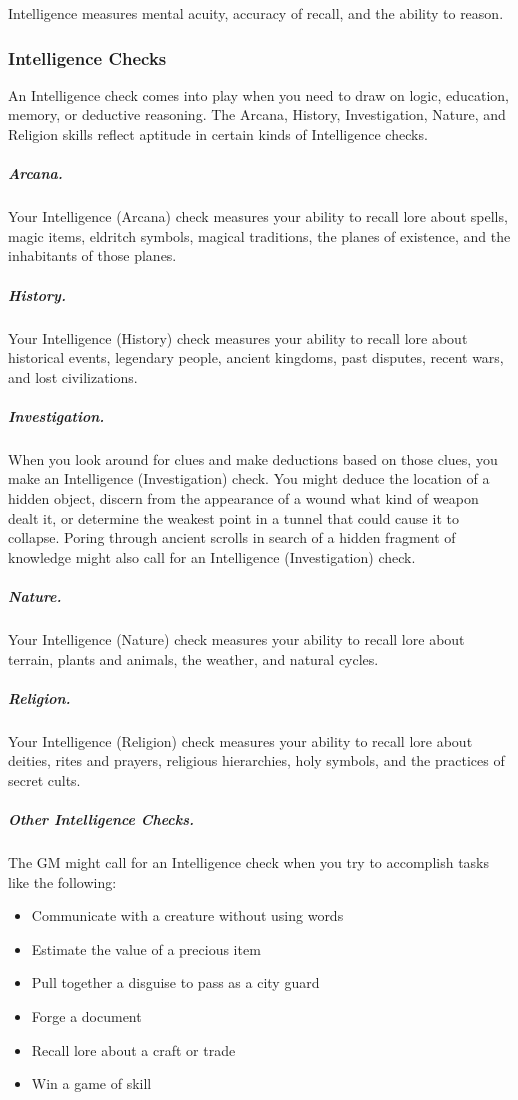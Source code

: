 Intelligence measures mental acuity, accuracy of recall, and the ability to reason.

\subsubsection{Intelligence Checks}

An Intelligence check comes into play when you need to draw on logic, education, memory, or deductive reasoning. The Arcana, History, Investigation, Nature, and Religion skills reflect aptitude in certain kinds of Intelligence checks.

\subparagraph*{Arcana.} Your Intelligence (Arcana) check measures your ability to recall lore about spells, magic items, eldritch symbols, magical traditions, the planes of existence, and the inhabitants of those planes.

\subparagraph*{History.} Your Intelligence (History) check measures your ability to recall lore about historical events, legendary people, ancient kingdoms, past disputes, recent wars, and lost civilizations.

\subparagraph*{Investigation.} When you look around for clues and make deductions based on those clues, you make an Intelligence (Investigation) check. You might deduce the location of a hidden object, discern from the appearance of a wound what kind of weapon dealt it, or determine the weakest point in a tunnel that could cause it to collapse. Poring through ancient scrolls in search of a hidden fragment of knowledge might also call for an Intelligence (Investigation) check.

\subparagraph*{Nature.} Your Intelligence (Nature) check measures your ability to recall lore about terrain, plants and animals, the weather, and natural cycles.

\subparagraph*{Religion.} Your Intelligence (Religion) check measures your ability to recall lore about deities, rites and prayers, religious hierarchies, holy symbols, and the practices of secret cults.

\subparagraph*{Other Intelligence Checks.} The GM might call for an Intelligence check when you try to accomplish tasks like the following:

\begin{itemize}
\item Communicate with a creature without using words
\item Estimate the value of a precious item
\item Pull together a disguise to pass as a city guard
\item Forge a document
\item Recall lore about a craft or trade
\item Win a game of skill
\end{itemize}

